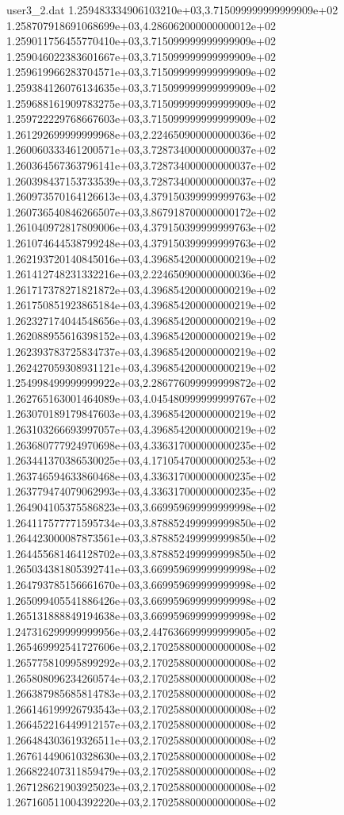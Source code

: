\begin{filecontents}{user3_2.dat}
1.259483334906103210e+03,3.715099999999999909e+02
1.258707918691068699e+03,4.286062000000000012e+02
1.259011756455770410e+03,3.715099999999999909e+02
1.259046022383601667e+03,3.715099999999999909e+02
1.259619966283704571e+03,3.715099999999999909e+02
1.259384126076134635e+03,3.715099999999999909e+02
1.259688161909783275e+03,3.715099999999999909e+02
1.259722229768667603e+03,3.715099999999999909e+02
1.261292699999999968e+03,2.224650900000000036e+02
1.260060333461200571e+03,3.728734000000000037e+02
1.260364567363796141e+03,3.728734000000000037e+02
1.260398437153733539e+03,3.728734000000000037e+02
1.260973570164126613e+03,4.379150399999999763e+02
1.260736540846266507e+03,3.867918700000000172e+02
1.261040972817809006e+03,4.379150399999999763e+02
1.261074644538799248e+03,4.379150399999999763e+02
1.262193720140845016e+03,4.396854200000000219e+02
1.261412748231332216e+03,2.224650900000000036e+02
1.261717378271821872e+03,4.396854200000000219e+02
1.261750851923865184e+03,4.396854200000000219e+02
1.262327174044548656e+03,4.396854200000000219e+02
1.262088955616398152e+03,4.396854200000000219e+02
1.262393783725834737e+03,4.396854200000000219e+02
1.262427059308931121e+03,4.396854200000000219e+02
1.254998499999999922e+03,2.286776099999999872e+02
1.262765163001464089e+03,4.045480999999999767e+02
1.263070189179847603e+03,4.396854200000000219e+02
1.263103266693997057e+03,4.396854200000000219e+02
1.263680777924970698e+03,4.336317000000000235e+02
1.263441370386530025e+03,4.171054700000000253e+02
1.263746594633860468e+03,4.336317000000000235e+02
1.263779474079062993e+03,4.336317000000000235e+02
1.264904105375586823e+03,3.669959699999999998e+02
1.264117577771595734e+03,3.878852499999999850e+02
1.264423000087873561e+03,3.878852499999999850e+02
1.264455681464128702e+03,3.878852499999999850e+02
1.265034381805392741e+03,3.669959699999999998e+02
1.264793785156661670e+03,3.669959699999999998e+02
1.265099405541886426e+03,3.669959699999999998e+02
1.265131888849194638e+03,3.669959699999999998e+02
1.247316299999999956e+03,2.447636699999999905e+02
1.265469992541727606e+03,2.170258800000000008e+02
1.265775810995899292e+03,2.170258800000000008e+02
1.265808096234260574e+03,2.170258800000000008e+02
1.266387985685814783e+03,2.170258800000000008e+02
1.266146199926793543e+03,2.170258800000000008e+02
1.266452216449912157e+03,2.170258800000000008e+02
1.266484303619326511e+03,2.170258800000000008e+02
1.267614490610328630e+03,2.170258800000000008e+02
1.266822407311859479e+03,2.170258800000000008e+02
1.267128621903925023e+03,2.170258800000000008e+02
1.267160511004392220e+03,2.170258800000000008e+02

\end{filecontents}

